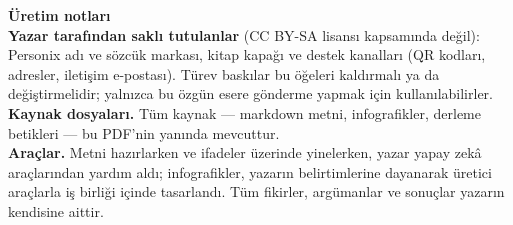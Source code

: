 \clearpage
\thispagestyle{empty}
\begin{flushleft}\small\sffamily
\textbf{Üretim notları}\\[1.2em]

\textbf{Yazar tarafından saklı tutulanlar} (CC BY-SA lisansı kapsamında değil):
Personix adı ve sözcük markası, kitap kapağı ve destek kanalları (QR kodları,
adresler, iletişim e-postası). Türev baskılar bu öğeleri kaldırmalı ya da
değiştirmelidir; yalnızca bu özgün esere gönderme yapmak için kullanılabilirler.\\[1.2em]

\textbf{Kaynak dosyaları.} Tüm kaynak --- markdown metni, infografikler,
derleme betikleri --- bu PDF'nin yanında mevcuttur.\\[1.2em]

\textbf{Araçlar.} Metni hazırlarken ve ifadeler üzerinde yinelerken, yazar
yapay zekâ araçlarından yardım aldı; infografikler, yazarın belirtimlerine
dayanarak üretici araçlarla iş birliği içinde tasarlandı. Tüm fikirler,
argümanlar ve sonuçlar yazarın kendisine aittir.
\end{flushleft}
\clearpage
